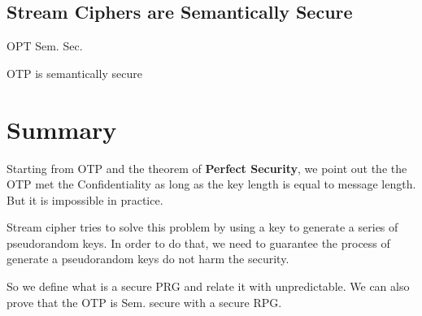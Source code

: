 \subsection{Stream Ciphers are Semantically Secure}

\begin{theorem}  OPT Sem. Sec.

    OTP is semantically secure
    
\end{theorem}


\section{Summary}

Starting from OTP and the theorem of \textbf{Perfect Security}, we point out the the OTP met the Confidentiality as long as the key length is equal to message length. But it is impossible in practice.

Stream cipher tries to solve this problem by using a key to generate a series of pseudorandom keys. In order to do that, we need to guarantee the process of generate a pseudorandom keys do not harm the security.

So we define what is a secure PRG and relate it with unpredictable. We can also prove that the OTP is Sem. secure with a secure RPG.
